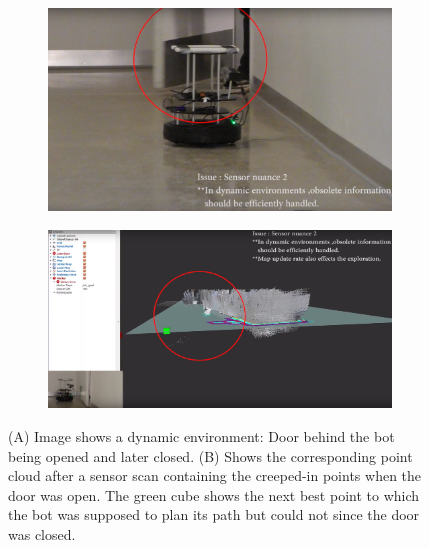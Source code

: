 \begin{figure}
    \begin{subfigure}[b]{0.498\textwidth}
		\includegraphics[width=\textwidth, height=0.6\textwidth]{images/maprate.png}
		\label{subfig:a}
		\caption{}
	\end{subfigure}
	\begin{subfigure}[b]{0.498\textwidth}
		\includegraphics[width=\textwidth, height=0.6\textwidth]{images/map2.png}
		\label{subfig:b}
		\caption{}
	\end{subfigure}
\caption{(A) Image shows a dynamic environment: Door behind the bot being opened and later closed. (B) Shows the corresponding point cloud after a sensor scan containing the creeped-in points when the door was open. The green cube shows the next best point to which the bot was supposed to plan its path but could not since the door was closed.}
\end{figure}

